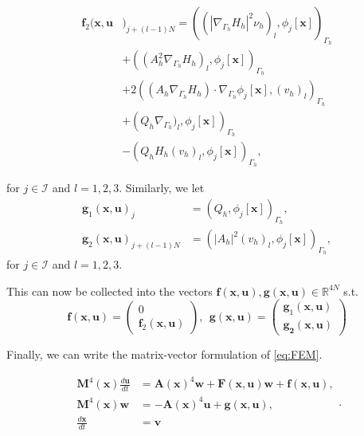 \begin{equation*}
    \begin{split}
        \mathbf{f}_{2}( \mathbf{x}, \mathbf{u}&)_{j + (l-1)N} = ( ( \left\lvert \nabla _{\Gamma _{h}} H_{h} \right\rvert ^2 \nu _{h})_{l} , \phi_{j}\left[ \mathbf{x} \right]   ) _{\Gamma _{h}}   \\
        & + ((A_{h}^2 \nabla _{\Gamma _{h}}H_{h})_{l}, \phi _{j} \left[ \mathbf{x} \right]  )_{\Gamma _{h}} \\
        & + 2((A_{h} \nabla _{\Gamma _{h}} H_{h})\cdot \nabla _{\Gamma _{h}} \phi _{j} \left[ \mathbf{x} \right] , ( v_{h}) _{l})_{\Gamma _{h}} \\
    & + \left(Q_{h}\nabla _{\Gamma _{h}})_{l},  \phi_{j} \left[ \mathbf{x} \right]  \right)_{\Gamma _{h}} \\
    &- \left(Q_{h} H_{h} ( v_{h}) _{l}, \phi _{j} \left[ \mathbf{x} \right]   \right)_{\Gamma_{h} },
    \end{split}
\end{equation*}

for $j \in \mathcal{I} $ and $l = 1,2,3$. Similarly, we let
\[
    \begin{split}
\mathbf{g}_{1}( \mathbf{x}, \mathbf{u}) _{j} & = \left( Q_{h}, \phi _{j}\left[ \mathbf{x} \right]  \right) _{\Gamma _{h}}, \\
\mathbf{g}_{2}\left( \mathbf{x}, \mathbf{u} \right)_{j + (l-1)N} & = \left( \left\lvert A_{h} \right\rvert ^2 ( v_{h}) _{l}, \phi _{j} \left[ \mathbf{x} \right]  \right)     _{\Gamma _{h}},
    \end{split}
\]
for $j \in \mathcal{I} $ and $l=1,2,3$.

This can now be collected into the vectors $\mathbf{f}( \mathbf{x}, \mathbf{u}), \mathbf{g}(\mathbf{x},\mathbf{u} ) \in \mathbb{R} ^{4N}  $ s.t. \[
\mathbf{f}( \mathbf{x}, \mathbf{u}) = \begin{pmatrix}
0\\
\mathbf{f}_{2}(\mathbf{x},\mathbf{u} )
\end{pmatrix}
, \ \ \mathbf{g} (\mathbf{x}, \mathbf{u})
 = \begin{pmatrix}
\mathbf{g}_{1}( \mathbf{x}, \mathbf{u}) \\
\mathbf{g_{2}( \mathbf{x}, \mathbf{u}) }
\end{pmatrix}
\]

Finally, we can write the matrix-vector formulation of \eqref{eq:FEM}.

\begin{equation}
\label{eq:matrix_form}
\begin{split}
   \mathbf{M}^{4}( \mathbf{x}) \frac{d \mathbf{u}}{dt}    & = \mathbf{A}( \mathbf{x}) ^{4} \mathbf{w} +  \mathbf{F}( \mathbf{x}, \mathbf{u}) \mathbf{w} + \mathbf{f}( \mathbf{x}, \mathbf{u}),     \\
   \mathbf{M}^{4}( \mathbf{x}) \mathbf{w}    & =- \mathbf{A}( \mathbf{x}) ^{4} \mathbf{u}+  \mathbf{g}( \mathbf{x}, \mathbf{u}), \\
   \frac{d\mathbf{x}}{dt}  & = \mathbf{v}
\end{split}
.\end{equation}



